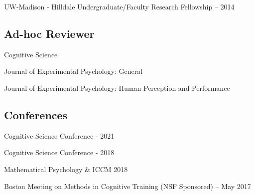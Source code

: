 \documentclass[
  11pt,
  letterpaper,
]{article}
\begin{document}
UW-Madison - Hilldale Undergraduate/Faculty Research Fellowship -- 2014

\subsection*{Ad-hoc Reviewer}\label{ad-hoc-reviewer}

Cognitive Science

Journal of Experimental Psychology: General

Journal of Experimental Psychology: Human Perception and Performance

\subsection*{Conferences}\label{conferences}

Cognitive Science Conference - 2021

Cognitive Science Conference - 2018

Mathematical Psychology \& ICCM 2018

Boston Meeting on Methods in Cognitive Training (NSF Sponsored) -- May
2017
\end{document}
